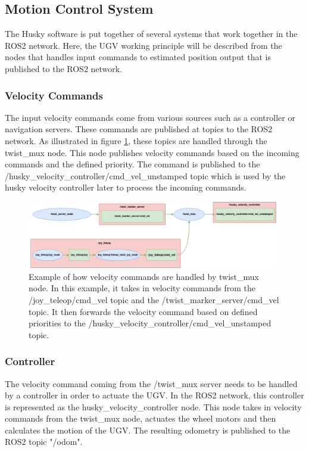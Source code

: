 \subsection{Motion Control System}\label{sec:M:AN:MotionControl}
The Husky software is put together of several systems that work together in the ROS2 network. Here, the UGV working principle will be described from the nodes that handles input commands to estimated position output that is published to the ROS2 network.

\subsubsection{Velocity Commands}
The input velocity commands come from various sources such as a controller or navigation servers. These commands are published at topics to the ROS2 network. As illustrated in figure \ref{fig:rqt_teleop}, these topics are handled through the twist\_mux node. This node publishes velocity commands based on the incoming commands and the defined priority. The command is published to the \\/husky\_velocity\_controller/cmd\_vel\_unstamped topic which is used by the husky velocity controller later to process the incoming commands.

\begin{figure}[H]
  \centering
  \includegraphics[width = 0.98\textwidth]{Figures/husky_teleop.drawio.png}
  \caption{Example of how velocity commands are handled by twist\_mux node. In this example, it takes in velocity commands from the /joy\_teleop/cmd\_vel topic and the /twist\_marker\_server/cmd\_vel topic. It then forwards the velocity command based on defined priorities to the /husky\_velocity\_controller/cmd\_vel\_unstamped topic.}
  \label{fig:rqt_teleop}
\end{figure}

\subsubsection{Controller}
The velocity command coming from the /twist\_mux server needs to be handled by a controller in order to actuate the UGV. In the ROS2 network, this controller is represented as the husky\_velocity\_controller node. This node takes in velocity commands from the twist\_mux node, actuates the wheel motors and then calculates the motion of the UGV. The resulting odometry is published to the ROS2 topic "/odom".

